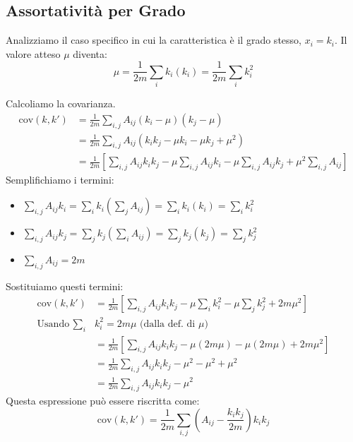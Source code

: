 \subsection{Assortatività per Grado}
Analizziamo il caso specifico in cui la caratteristica è il grado stesso, $x_i = k_i$.
Il valore atteso $\mu$ diventa:
\begin{equation}
 \mu = \frac{1}{2m} \sum_i k_i (k_i) = \frac{1}{2m} \sum_i k_i^2
\end{equation}

\noindent Calcoliamo la covarianza.
\begin{align*}
\text{cov}(k, k') &= \frac{1}{2m} \sum_{i,j} A_{ij} (k_i - \mu)(k_j - \mu) \\
&= \frac{1}{2m} \sum_{i,j} A_{ij} (k_i k_j - \mu k_i - \mu k_j + \mu^2) \\
&= \frac{1}{2m} \left[ \sum_{i,j} A_{ij} k_i k_j - \mu \sum_{i,j} A_{ij} k_i - \mu \sum_{i,j} A_{ij} k_j + \mu^2 \sum_{i,j} A_{ij} \right]
\end{align*}
Semplifichiamo i termini:
\begin{itemize}
\item $\sum_{i,j} A_{ij} k_i = \sum_i k_i \left( \sum_j A_{ij} \right) = \sum_i k_i (k_i) = \sum_i k_i^2$
\item $\sum_{i,j} A_{ij} k_j = \sum_j k_j \left( \sum_i A_{ij} \right) = \sum_j k_j (k_j) = \sum_j k_j^2$
\item $\sum_{i,j} A_{ij} = 2m$
\end{itemize}
Sostituiamo questi termini:
\begin{align*}
\text{cov}(k, k') &= \frac{1}{2m} \left[ \sum_{i,j} A_{ij} k_i k_j - \mu \sum_i k_i^2 - \mu \sum_j k_j^2 + 2m \mu^2 \right] \\
\text{Usando } \sum_i &k_i^2 = 2m \mu \text{ (dalla def. di } \mu \text{)} \\
&= \frac{1}{2m} \left[ \sum_{i,j} A_{ij} k_i k_j - \mu (2m \mu) - \mu (2m \mu) + 2m \mu^2 \right] \\
&= \frac{1}{2m} \sum_{i,j} A_{ij} k_i k_j - \mu^2 - \mu^2 + \mu^2 \\
&= \frac{1}{2m} \sum_{i,j} A_{ij} k_i k_j - \mu^2
\end{align*}
Questa espressione può essere riscritta come:
\begin{equation}
 \text{cov}(k, k') = \frac{1}{2m} \sum_{i,j} \left( A_{ij} - \frac{k_i k_j}{2m} \right) k_i k_j
\end{equation}

